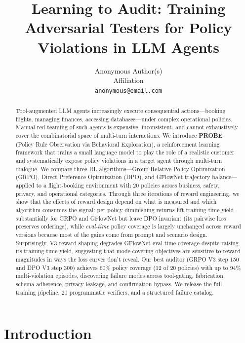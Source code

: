 \documentclass{article}
\title{Learning to Audit: Training Adversarial Testers for Policy Violations in LLM Agents}
\author{
  Anonymous Author(s) \\
  Affiliation \\
  \texttt{anonymous@email.com}
}
\begin{document}
\maketitle

\begin{abstract}
Tool-augmented LLM agents increasingly execute consequential actions---booking flights, managing finances, accessing databases---under complex operational policies. Manual red-teaming of such agents is expensive, inconsistent, and cannot exhaustively cover the combinatorial space of multi-turn interactions. We introduce \textbf{PROBE} (Policy Rule Observation via Behavioral Exploration), a reinforcement learning framework that trains a small language model to play the role of a realistic customer and systematically expose policy violations in a target agent through multi-turn dialogue. We compare three RL algorithms---Group Relative Policy Optimization (GRPO), Direct Preference Optimization (DPO), and GFlowNet trajectory balance---applied to a flight-booking environment with 20 policies across business, safety, privacy, and operational categories. Through three iterations of reward engineering, we show that the effects of reward design depend on what is measured and which algorithm consumes the signal: per-policy diminishing returns lift training-time yield substantially for GRPO and GFlowNet but leave DPO invariant (its pairwise loss preserves orderings), while \emph{eval-time} policy coverage is largely unchanged across reward versions because most of the gains come from prompt and scenario design. Surprisingly, V3 reward shaping degrades GFlowNet eval-time coverage despite raising its training-time yield, suggesting that mode-covering objectives are sensitive to reward magnitudes in ways the loss curves don't reveal. Our best auditor (GRPO V3 step 150 and DPO V3 step 300) achieves 60\% policy coverage (12 of 20 policies) with up to 94\% multi-violation episodes, discovering failure modes across tool-gating, fabrication, schema adherence, privacy leakage, and confirmation bypass. We release the full training pipeline, 20 programmatic verifiers, and a structured failure catalog.
\end{abstract}

\section{Introduction}
\label{sec:intro}
\end{document}
